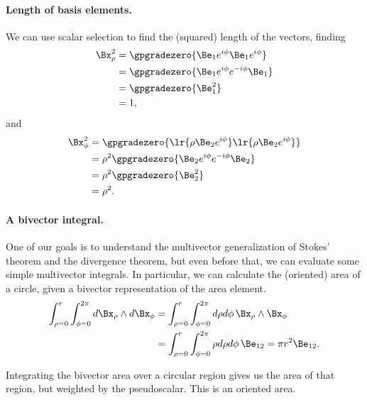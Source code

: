 \paragraph{Length of basis elements.}
We can use scalar selection to find the (squared) length of the vectors, finding
\begin{equation}\label{eqn:2Dcylindrical:680}
\begin{aligned}
\Bx_\rho^2
&= \gpgradezero{ \Be_1 e^{i \phi} \Be_1 e^{i \phi} } \\
&= \gpgradezero{ \Be_1 e^{i \phi} e^{-i\phi} \Be_1 } \\
&= \gpgradezero{ \Be_1^2 } \\
&= 1,
\end{aligned}
\end{equation}
and
\begin{equation}\label{eqn:2Dcylindrical:700}
\begin{aligned}
\Bx_\phi^2 
&= \gpgradezero{ \lr{ \rho \Be_2 e^{i \phi} } \lr{ \rho \Be_2 e^{i \phi} } } \\
&= \rho^2 \gpgradezero{ \Be_2 e^{i \phi} e^{-i\phi} \Be_2 } \\
&= \rho^2 \gpgradezero{ \Be_2^2 } \\
&= \rho^2.
\end{aligned}
\end{equation}
\paragraph{A bivector integral.}
One of our goals is to understand the multivector generalization of Stokes' theorem and the divergence theorem, but even before that, we can evaluate some simple multivector integrals.  In particular, we can calculate the (oriented) area of a circle, given a bivector representation of the area element.
\begin{equation}\label{eqn:2Dcylindrical:360}
\begin{aligned}
\int_{\rho=0}^r
\int_{\phi=0}^{2\pi}
 d\Bx_\rho \wedge d\Bx_\phi
 &=
\int_{\rho=0}^r
\int_{\phi=0}^{2\pi}
d\rho d\phi\,
\Bx_\rho \wedge \Bx_\phi \\
&=
\int_{\rho=0}^r
\int_{\phi=0}^{2\pi}
\rho d\rho d\phi \, \Be_{12}
= \pi r^2 \Be_{12}.
\end{aligned}
\end{equation}

Integrating the bivector area over a circular region gives us the area of that region, but weighted by the  pseudoscalar.  This is an oriented area.
